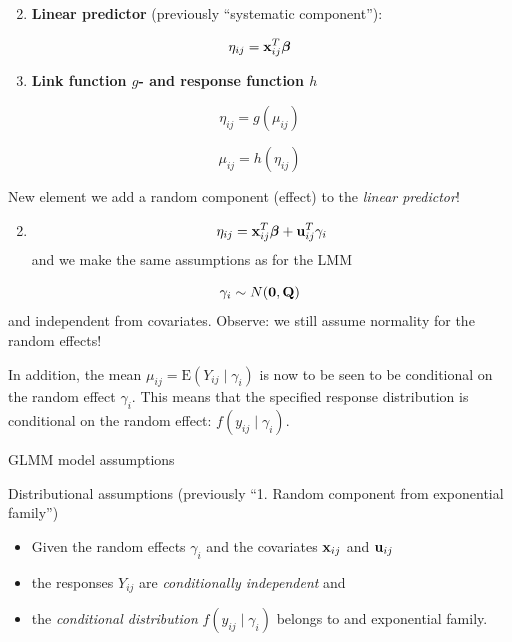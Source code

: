 \documentclass[
  ignorenonframetext,
]{beamer}
\providecommand{\tightlist}{%
  \setlength{\itemsep}{0pt}\setlength{\parskip}{0pt}}
\begin{document}
\begin{frame}
\begin{enumerate}
\setcounter{enumi}{1}
\tightlist
\item
  \textbf{Linear predictor} (previously ``systematic component''):
\end{enumerate}

\[\eta_{ij}={\bf x}_{ij}^T {\boldsymbol \beta}\]

\begin{enumerate}
\setcounter{enumi}{2}
\tightlist
\item
  \textbf{Link function \(g\)- and response function \(h\)}
\end{enumerate}

\[\eta_{ij}=g(\mu_{ij})\]

\[\mu_{ij}=h(\eta_{ij})\]
\end{frame}

\begin{frame}
\begin{block}{New element}
\protect{}\label{new-element}
we add a random component (effect) to the \emph{linear predictor}!

\begin{enumerate}
\setcounter{enumi}{1}
\tightlist
\item
  \[\eta_{ij}={\bf x}_{ij}^T {\boldsymbol \beta}+ {\bf u}^T_{ij} \gamma_i\]
  and we make the same assumptions as for the LMM
\end{enumerate}

\[ \gamma_i \sim N({\bf 0},{\bf Q})\] and independent from covariates.
Observe: we still assume normality for the random effects!

In addition, the mean \(\mu_{ij}=\text{E}(Y_{ij}\mid \gamma_i)\) is now
to be seen to be conditional on the random effect \(\gamma_i\). This
means that the specified response distribution is conditional on the
random effect: \(f(y_{ij}\mid \gamma_i)\).
\end{block}
\end{frame}

\begin{frame}
\begin{block}{GLMM model assumptions}
\protect{}\label{glmm-model-assumptions}
\begin{block}{Distributional assumptions}
\protect{}\label{distributional-assumptions}
(previously ``1. Random component from exponential family'')

\begin{itemize}
\tightlist
\item
  Given the random effects \(\gamma_i\) and the covariates
  \({\bf x}_{ij}\) and \({\bf u}_{ij}\)
\item
  the responses \(Y_{ij}\) are \emph{conditionally independent} and
\item
  the \emph{conditional distribution} \(f(y_{ij}\mid \gamma_i)\) belongs
  to and exponential family.
\end{itemize}
\end{block}
\end{block}
\end{frame}
\end{document}
